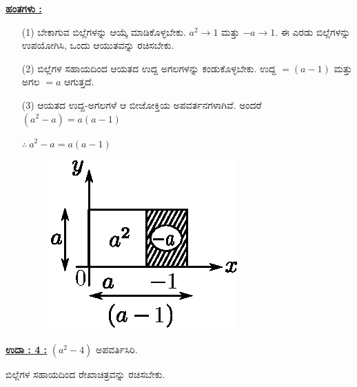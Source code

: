 \noindent
{\textbf{\underline{ಹಂತಗಳು :}}}
\begin{itemize}
\item [(1)] ಬೇಕಾಗುವ ಬಿಲ್ಲೆಗಳನ್ನು ಆಯ್ಕೆ ಮಾಡಿಕೊಳ್ಳಬೇಕು. $a^2 \rightarrow 1$ ಮತ್ತು $-a \rightarrow 1$. ಈ ಎರಡು ಬಿಲ್ಲೆಗಳನ್ನು ಉಪಯೋಗಿಸಿ, ಒಂದು ಆಯುತವನ್ನು ರಚಿಸಬೇಕು. 
\item [(2)] ಬಿಲ್ಲೆಗಳ ಸಹಾಯದಿಂದ ಆಯತದ ಉದ್ದ ಅಗಲಗಳನ್ನು ಕಂಡುಕೊಳ್ಳಬೇಕು. ಉದ್ದ $= (a-1)$ ಮತ್ತು ಅಗಲ $= a$ ಆಗುತ್ತದೆ. 
\item [(3)] ಆಯತದ ಉದ್ದ-ಅಗಲಗಳೆ ಆ ಬೀಜೋಕ್ತಿಯ ಅಪವರ್ತನಗಳಾಗಿವೆ. ಅಂದರೆ\break $(a^2 - a) = a(a-1)$

$\therefore~ a^2 - a = a(a-1)$
\begin{figure}[H]
\centering
\includegraphics[scale=0.8]{src/figure/chap3/fig3-36b.eps}
\end{figure}
\end{itemize}

\noindent
{\textbf{\underline{ಉದಾ : 4 :}}} $(a^2 - 4)$ ಅಪವರ್ತಿಸಿರಿ. 

ಬಿಲ್ಲೆಗಳ ಸಹಾಯದಿಂದ ರೇಖಾಚಿತ್ರವನ್ನು ರಚಿಸಬೇಕು.

